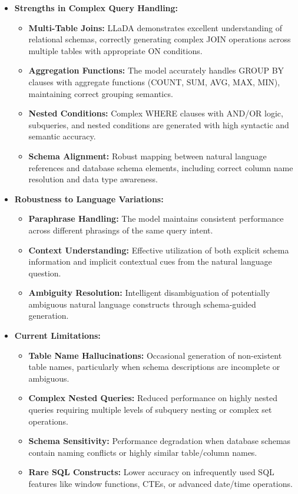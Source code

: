 \documentclass[a4paper,12pt]{article}
\begin{document}
\begin{itemize}
    \item \textbf{Strengths in Complex Query Handling:} 
    \begin{itemize}
        \item \textbf{Multi-Table Joins:} LLaDA demonstrates excellent understanding of relational schemas, correctly generating complex JOIN operations across multiple tables with appropriate ON conditions.
        \item \textbf{Aggregation Functions:} The model accurately handles GROUP BY clauses with aggregate functions (COUNT, SUM, AVG, MAX, MIN), maintaining correct grouping semantics.
        \item \textbf{Nested Conditions:} Complex WHERE clauses with AND/OR logic, subqueries, and nested conditions are generated with high syntactic and semantic accuracy.
        \item \textbf{Schema Alignment:} Robust mapping between natural language references and database schema elements, including correct column name resolution and data type awareness.
    \end{itemize}
    
    \item \textbf{Robustness to Language Variations:}
    \begin{itemize}
        \item \textbf{Paraphrase Handling:} The model maintains consistent performance across different phrasings of the same query intent.
        \item \textbf{Context Understanding:} Effective utilization of both explicit schema information and implicit contextual cues from the natural language question.
        \item \textbf{Ambiguity Resolution:} Intelligent disambiguation of potentially ambiguous natural language constructs through schema-guided generation.
    \end{itemize}
    
    \item \textbf{Current Limitations:}
    \begin{itemize}
        \item \textbf{Table Name Hallucinations:} Occasional generation of non-existent table names, particularly when schema descriptions are incomplete or ambiguous.
        \item \textbf{Complex Nested Queries:} Reduced performance on highly nested queries requiring multiple levels of subquery nesting or complex set operations.
        \item \textbf{Schema Sensitivity:} Performance degradation when database schemas contain naming conflicts or highly similar table/column names.
        \item \textbf{Rare SQL Constructs:} Lower accuracy on infrequently used SQL features like window functions, CTEs, or advanced date/time operations.
    \end{itemize}
\end{itemize}
\end{document}

